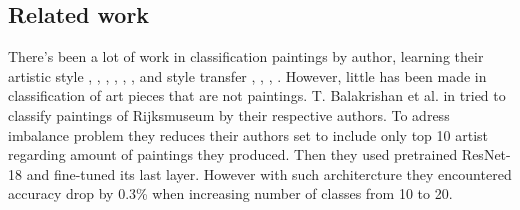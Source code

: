 \documentclass[10pt,twocolumn,letterpaper]{article}
\begin{document}
\subsection{Related work}

There's been a lot of work in classification paintings by author, learning their artistic style  \cite{paint_class}, \cite{rec_style}, \cite{learned_style}, \cite{draw_style}, \cite{la_style}, \cite{la_style_2}, and style transfer \cite{johnson_style_transf}, \cite{huang_style_transf}, \cite{ulyaniv_stylized_img}, \cite{jie_style_transf}. However, little has been made in classification of art pieces that are not paintings. 
T. Balakrishan et al. in \cite{Rijks} tried to classify paintings of Rijksmuseum by their respective authors. To adress imbalance problem they reduces their authors set to include only top 10 artist regarding amount of paintings they produced. Then they used pretrained ResNet-18 and fine-tuned its last layer. However with such architercture they encountered accuracy drop by 0.3\% when increasing number of classes from 10 to 20.


\end{document}
